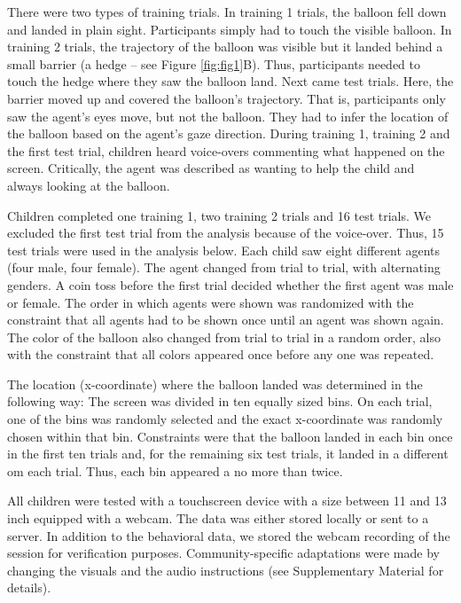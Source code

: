 \documentclass[
  man,floatsintext]{apa7}
\begin{document}
There were two types of training trials. In training 1 trials, the balloon fell down and landed in plain sight. Participants simply had to touch the visible balloon. In training 2 trials, the trajectory of the balloon was visible but it landed behind a small barrier (a hedge -- see Figure \ref{fig:fig1}B). Thus, participants needed to touch the hedge where they saw the balloon land. Next came test trials. Here, the barrier moved up and covered the balloon's trajectory. That is, participants only saw the agent's eyes move, but not the balloon. They had to infer the location of the balloon based on the agent's gaze direction. During training 1, training 2 and the first test trial, children heard voice-overs commenting what happened on the screen. Critically, the agent was described as wanting to help the child and always looking at the balloon.

Children completed one training 1, two training 2 trials and 16 test trials. We excluded the first test trial from the analysis because of the voice-over. Thus, 15 test trials were used in the analysis below. Each child saw eight different agents (four male, four female). The agent changed from trial to trial, with alternating genders. A coin toss before the first trial decided whether the first agent was male or female. The order in which agents were shown was randomized with the constraint that all agents had to be shown once until an agent was shown again. The color of the balloon also changed from trial to trial in a random order, also with the constraint that all colors appeared once before any one was repeated.

The location (x-coordinate) where the balloon landed was determined in the following way: The screen was divided in ten equally sized bins. On each trial, one of the bins was randomly selected and the exact x-coordinate was randomly chosen within that bin. Constraints were that the balloon landed in each bin once in the first ten trials and, for the remaining six test trials, it landed in a different om each trial. Thus, each bin appeared a no more than twice.

All children were tested with a touchscreen device with a size between 11 and 13 inch equipped with a webcam. The data was either stored locally or sent to a server. In addition to the behavioral data, we stored the webcam recording of the session for verification purposes. Community-specific adaptations were made by changing the visuals and the audio instructions (see Supplementary Material for details).
\end{document}
